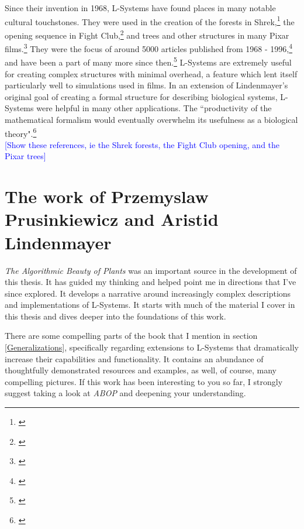 \documentclass[12pt,twoside]{reedthesis}
\begin{document}
	Since their invention in 1968, L-Systems have found places in many notable cultural touchstones. They were used in the creation of the forests in Shrek,\footnote{\cite{shrek2001}} the opening sequence in Fight Club,\footnote{\cite{FightClub1999}} and trees and other structures in many Pixar films.\footnote{\cite{theory2004}} They were the focus of around 5000 articles published from 1968 - 1996,\footnote{\cite{theory2004}} and have been a part of many more since then.\footnote{\cite{manyPapers}} L-Systems are extremely useful for creating complex structures with minimal overhead, a feature which lent itself particularly well to simulations used in films. In an extension of Lindenmayer's original goal of creating a formal structure for describing biological systems, L-Systems were helpful in many other applications. The ``productivity of the mathematical formalism would eventually overwhelm its usefulness as a biological theory".\footnote{\cite{theory2004}}\\
	
	\textcolor{blue}{[Show these references, ie the Shrek forests, the Fight Club opening, and the Pixar trees]}\\
	
	
	


\section{The work of Przemyslaw Prusinkiewicz and Aristid Lindenmayer}
	
	\textit{The Algorithmic Beauty of Plants} was an important source in the development of this thesis. It has guided my thinking and helped point me in directions that I've since explored. It develops a narrative around increasingly complex descriptions and implementations of L-Systems. It starts with much of the material I cover in this thesis and dives deeper into the foundations of this work.
	
	There are some compelling parts of the book that I mention in section \ref{Generalizations}, specifically regarding extensions to L-Systems that dramatically increase their capabilities and functionality. It contains an abundance of thoughtfully demonstrated resources and examples, as well, of course, many compelling pictures. If this work has been interesting to you so far, I strongly suggest taking a look at \textit{ABOP} and deepening your understanding.\\
	
\end{document}
